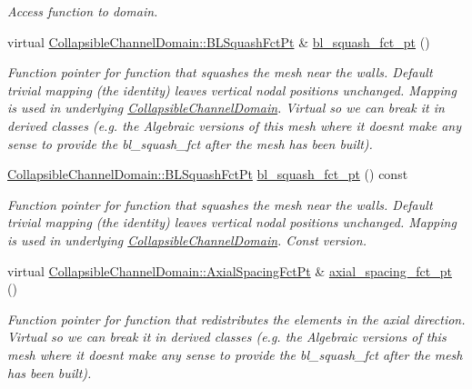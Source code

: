 \begin{DoxyCompactItemize}
\begin{DoxyCompactList}\small\item\em Access function to domain. \end{DoxyCompactList}\item 
virtual \hyperlink{classoomph_1_1CollapsibleChannelDomain_a2bf1d7943bfac134a5c27a54c7e1faed}{Collapsible\+Channel\+Domain\+::\+B\+L\+Squash\+Fct\+Pt} \& \hyperlink{classoomph_1_1CollapsibleChannelMesh_aac6057b4e572cb47923570b5e9c781c4}{bl\+\_\+squash\+\_\+fct\+\_\+pt} ()
\begin{DoxyCompactList}\small\item\em Function pointer for function that squashes the mesh near the walls. Default trivial mapping (the identity) leaves vertical nodal positions unchanged. Mapping is used in underlying \hyperlink{classoomph_1_1CollapsibleChannelDomain}{Collapsible\+Channel\+Domain}. Virtual so we can break it in derived classes (e.\+g. the Algebraic versions of this mesh where it doesn\textquotesingle{}t make any sense to provide the bl\+\_\+squash\+\_\+fct after the mesh has been built). \end{DoxyCompactList}\item 
\hyperlink{classoomph_1_1CollapsibleChannelDomain_a2bf1d7943bfac134a5c27a54c7e1faed}{Collapsible\+Channel\+Domain\+::\+B\+L\+Squash\+Fct\+Pt} \hyperlink{classoomph_1_1CollapsibleChannelMesh_a5c073c93cce7e6b6e9de86f36cb1e965}{bl\+\_\+squash\+\_\+fct\+\_\+pt} () const
\begin{DoxyCompactList}\small\item\em Function pointer for function that squashes the mesh near the walls. Default trivial mapping (the identity) leaves vertical nodal positions unchanged. Mapping is used in underlying \hyperlink{classoomph_1_1CollapsibleChannelDomain}{Collapsible\+Channel\+Domain}. Const version. \end{DoxyCompactList}\item 
virtual \hyperlink{classoomph_1_1CollapsibleChannelDomain_a317472dab112beac771ecf6442a465f5}{Collapsible\+Channel\+Domain\+::\+Axial\+Spacing\+Fct\+Pt} \& \hyperlink{classoomph_1_1CollapsibleChannelMesh_ac7913dca6b8b11240caede54414f3c11}{axial\+\_\+spacing\+\_\+fct\+\_\+pt} ()
\begin{DoxyCompactList}\small\item\em Function pointer for function that redistributes the elements in the axial direction. Virtual so we can break it in derived classes (e.\+g. the Algebraic versions of this mesh where it doesn\textquotesingle{}t make any sense to provide the bl\+\_\+squash\+\_\+fct after the mesh has been built). \end{DoxyCompactList}\item 

\end{DoxyCompactItemize}
